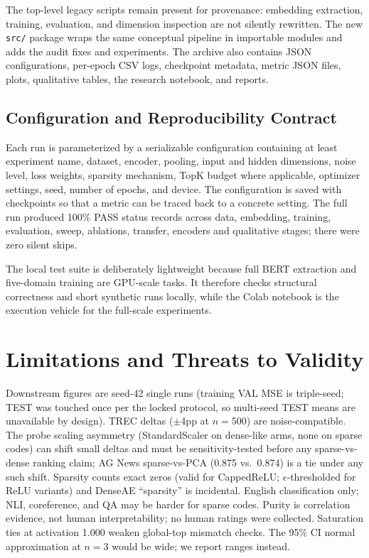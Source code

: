 \documentclass[conference]{IEEEtran}
\begin{document}
The top-level legacy scripts remain present for provenance: embedding
extraction, training, evaluation, and dimension inspection are not
silently rewritten. The new \texttt{src/} package wraps the same
conceptual pipeline in importable modules and adds the audit fixes and
experiments. The archive also contains JSON configurations, per-epoch CSV
logs, checkpoint metadata, metric JSON files, plots, qualitative tables,
the research notebook, and reports.

\subsection{Configuration and Reproducibility Contract}
Each run is parameterized by a serializable configuration containing at
least experiment name, dataset, encoder, pooling, input and hidden
dimensions, noise level, loss weights, sparsity mechanism, TopK budget
where applicable, optimizer settings, seed, number of epochs, and device.
The configuration is saved with checkpoints so that a metric can be traced
back to a concrete setting. The full run produced 100\% PASS status records
across data, embedding, training, evaluation, sweep, ablations, transfer,
encoders and qualitative stages; there were zero silent skips.

The local test suite is deliberately lightweight because full BERT
extraction and five-domain training are GPU-scale tasks. It therefore
checks structural correctness and short synthetic runs locally, while the
Colab notebook is the execution vehicle for the full-scale experiments.

\section{Limitations and Threats to Validity}
Downstream figures are seed-42 single runs (training VAL MSE is
triple-seed; TEST was touched once per the locked protocol, so multi-seed
TEST means are unavailable by design). TREC deltas ($\pm$4pp at $n=500$)
are noise-compatible. The probe scaling asymmetry (StandardScaler on
dense-like arms, none on sparse codes) can shift small deltas and must be
sensitivity-tested before any sparse-vs-dense ranking claim; AG News
sparse-vs-PCA (0.875 vs.\ 0.874) is a tie under any such shift. Sparsity
counts exact zeros (valid for CappedReLU; $\epsilon$-thresholded for ReLU
variants) and DenseAE ``sparsity'' is incidental. English classification
only; NLI, coreference, and QA may be harder for sparse codes. Purity is
correlation evidence, not human interpretability; no human ratings were
collected. Saturation ties at activation 1.000 weaken global-top mismatch
checks. The 95\% CI normal approximation at $n=3$ would be wide; we report
ranges instead.
\end{document}
